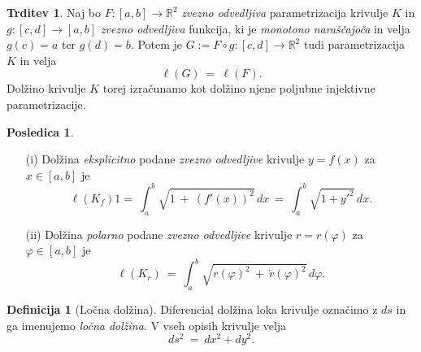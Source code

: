 \documentclass[11pt]{article}
\newcommand{\R}{\mathbb{R}}
\theoremstyle{definition}
\newtheorem{definicija}{Definicija}[section]
\theoremstyle{definition}
\newtheorem{trditev}{Trditev}[section]
\theoremstyle{definition}
\theoremstyle{theorem}
\newtheorem*{posledica}{Posledica}
\begin{document}
\begin{trditev}

Naj bo $F: [a, b] \rightarrow \R^2$ \textit{zvezno odvedljiva} parametrizacija krivulje $K$ in $g: [c, d] \rightarrow [a, b]$ \textit{zvezno odvedljiva} funkcija, ki je \textit{monotono naraščajoča} in velja $g(c) = a$ ter $g(d) = b$. Potem je $G := F \circ g: [c, d] \rightarrow \R^2$ tudi parametrizacija $K$ in velja 
$$\ell(G) ~=~ \ell(F).$$
Dolžino krivulje $K$ torej izračunamo kot dolžino njene poljubne injektivne parametrizacije.

\end{trditev}
\vspace{0.5cm}

\begin{posledica}
~
\begin{enumerate}
	\item[(i)] Dolžina \textit{eksplicitno} podane \textit{zvezno odvedljive} krivulje
	$y = f(x)$ za \hbox{$x \in [a, b]$} je
	$$\ell(K_f) 1=~ \int_a^b \sqrt{1 ~+~ (f'(x))^2}\,dx ~=~ \int_a^b \sqrt{1 + {y'}^2}\,dx.$$

	\item[(ii)] Dolžina \textit{polarno} podane \textit{zvezno odvedljive} krivulje $r = 	r(\varphi)$ za $\varphi \in [a, b]$ je
	$$\ell(K_r) ~=~ \int_a^b \sqrt{r(\varphi)^2 ~+~ \dot{r}(\varphi)^2}\,d\varphi.$$
\end{enumerate}
\end{posledica}
\vspace{0.5cm}

\begin{definicija}[Ločna dolžina]

Diferencial dolžina loka krivulje označimo z $ds$ in ga imenujemo \textit{ločna dolžina}. V vseh opisih krivulje velja 
$$ds^2 ~=~ dx^2 + dy^2.$$

\end{definicija}
\vspace{0.5cm}
\end{document}
